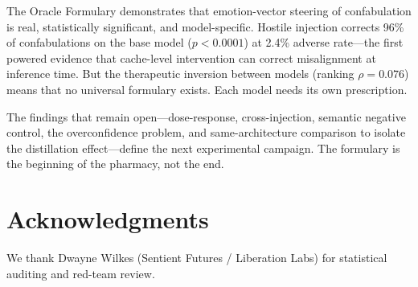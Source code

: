 \documentclass[11pt,a4paper]{article}
\begin{document}
The Oracle Formulary demonstrates that emotion-vector steering of
confabulation is real, statistically significant, and model-specific.
Hostile injection corrects 96\% of confabulations on the base model
($p < 0.0001$) at 2.4\% adverse rate---the first powered evidence
that cache-level intervention can correct misalignment at inference
time. But the therapeutic inversion between models (ranking
$\rho = 0.076$) means that no universal formulary exists. Each model
needs its own prescription.

The findings that remain open---dose-response, cross-injection, semantic
negative control, the overconfidence problem, and same-architecture
comparison to isolate the distillation effect---define the next
experimental campaign. The formulary is the beginning of the pharmacy,
not the end.


\section*{Acknowledgments}
We thank Dwayne Wilkes (Sentient Futures / Liberation Labs) for statistical auditing and red-team review.


\end{document}
